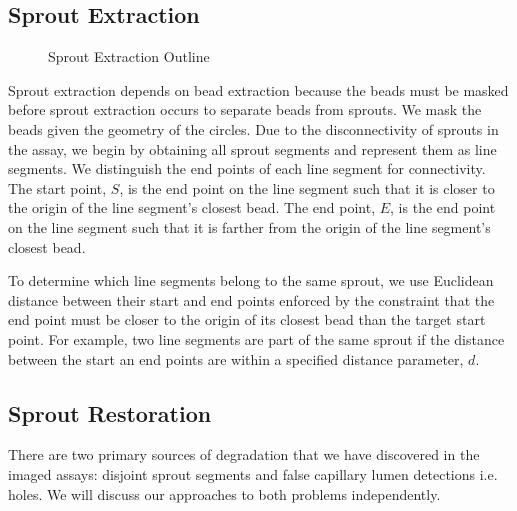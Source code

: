 \documentclass{sig-alternate}
\begin{document}
	\subsection{Sprout Extraction} %
	\label{sub:Sprout Extraction}
		\begin{figure}[htp!]
			\centering
			\caption{Sprout Extraction Outline}
			\label{fig:beadex}
		\end{figure}

		Sprout extraction depends on bead extraction because the beads must be
		masked before sprout extraction occurs to separate beads from sprouts.
		We mask the beads given the geometry of the circles. Due to the
		disconnectivity of sprouts in the assay, we begin by obtaining all
		sprout segments and represent them as line segments. We distinguish the
		end points of each line segment for connectivity. The start point, $S$,
		is the end point on the line segment such that it is closer to the
		origin of the line segment's closest bead. The end point, $E$, is the
		end point on the line segment such that it is farther from the origin
		of the line segment's closest bead.

		To determine which line segments belong to the same sprout, we use
		Euclidean distance between their start and end points enforced by
		the constraint that the end point must be closer to the origin of
		its closest bead than the target start point. For example, two
		line segments are part of the same sprout if the distance between
		the start an end points are within a specified distance parameter,
		$d$.

	\subsection{Sprout Restoration} %
	\label{sub:Sprout Restoration}
		There are two primary sources of degradation that we have discovered in
		the imaged assays: disjoint sprout segments and false capillary lumen
		detections i.e. holes. We will discuss our approaches to both problems
		independently. 
		
\end{document}

